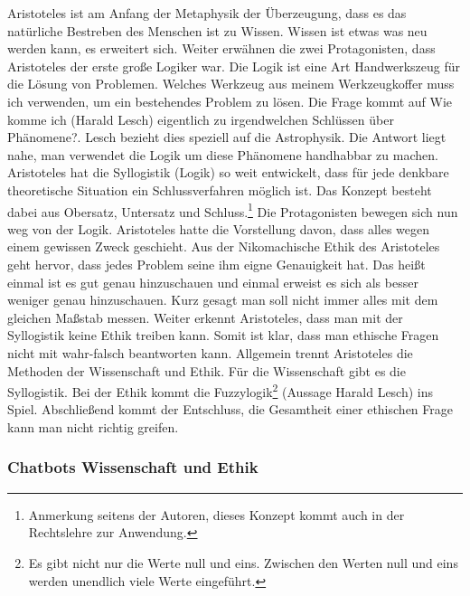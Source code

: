 Aristoteles ist am Anfang der Metaphysik der Überzeugung, dass es das natürliche Bestreben des Menschen ist zu Wissen. Wissen ist etwas was neu werden kann, es erweitert sich. Weiter erwähnen die zwei Protagonisten, dass Aristoteles der erste große Logiker war. Die Logik ist eine Art Handwerkszeug für die Lösung von Problemen. Welches Werkzeug aus meinem Werkzeugkoffer muss ich verwenden, um ein bestehendes Problem zu lösen. Die Frage kommt auf \glqq Wie komme ich (Harald Lesch) eigentlich zu irgendwelchen Schlüssen über Phänomene?\grqq. Lesch bezieht dies speziell auf die Astrophysik. Die Antwort liegt nahe, man verwendet die Logik um diese Phänomene handhabbar zu machen. Aristoteles hat die Syllogistik (Logik) so weit entwickelt, dass für jede denkbare theoretische Situation ein Schlussverfahren möglich ist. Das Konzept besteht dabei aus Obersatz, Untersatz und Schluss.\footnote{Anmerkung seitens der Autoren, dieses Konzept kommt auch in der Rechtslehre zur Anwendung.} Die Protagonisten bewegen sich nun weg von der Logik. Aristoteles hatte die Vorstellung davon, dass alles wegen einem gewissen Zweck geschieht. Aus der Nikomachische Ethik des Aristoteles geht hervor, dass jedes Problem seine ihm eigne Genauigkeit hat. Das heißt einmal ist es gut genau hinzuschauen und einmal erweist es sich als besser weniger genau hinzuschauen. Kurz gesagt man soll nicht immer alles mit dem gleichen Maßstab messen. Weiter erkennt Aristoteles, dass man mit der Syllogistik keine Ethik treiben kann. Somit ist klar, dass man ethische Fragen nicht mit wahr-falsch beantworten kann. Allgemein trennt Aristoteles die Methoden der Wissenschaft und Ethik. Für die Wissenschaft gibt es die Syllogistik. Bei der Ethik kommt die Fuzzylogik\footnote{Es gibt nicht nur die Werte null und eins. Zwischen  den Werten null und eins werden unendlich viele Werte eingeführt.} (Aussage Harald Lesch) ins Spiel. Abschließend kommt der Entschluss, die Gesamtheit einer ethischen Frage kann man nicht richtig greifen. 

\subsubsection{Chatbots Wissenschaft und Ethik}

